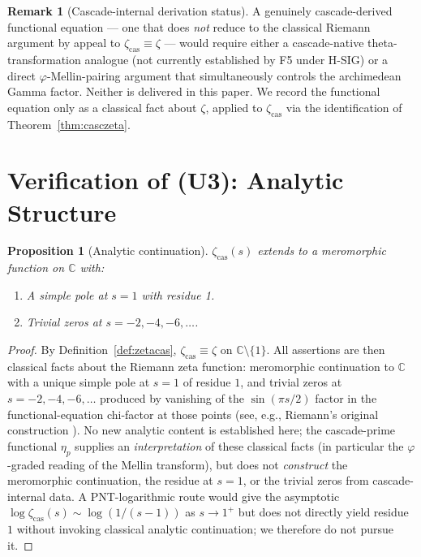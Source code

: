 \documentclass[11pt, a4paper]{amsart}
\newtheorem{proposition}[theorem]{Proposition}
\theoremstyle{definition}
\newtheorem{remark}[theorem]{Remark}
\newcommand{\C}{\mathbb{C}}
\newcommand{\pphi}{\varphi}
\newcommand{\zetacas}{\zeta_{\mathrm{cas}}}
\begin{document}
\begin{remark}[Cascade-internal derivation status]
A genuinely cascade-derived functional equation --- one that does
\emph{not} reduce to the classical Riemann argument by appeal to
$\zetacas \equiv \zeta$ --- would require either a cascade-native
theta-transformation analogue (not currently established by F5
under H-SIG) or a direct $\pphi$-Mellin-pairing argument that
simultaneously controls the archimedean Gamma factor.  Neither is
delivered in this paper.  We record the functional equation only
as a classical fact about $\zeta$, applied to $\zetacas$ via the
identification of Theorem~\ref{thm:casczeta}.
\end{remark}

\section{Verification of (U3): Analytic Structure}\label{sec:analytic}

\begin{proposition}[Analytic continuation]\label{prop:analytic}
$\zetacas(s)$ extends to a meromorphic function on $\C$ with:
\begin{enumerate}
\item[(a)] A simple pole at $s=1$ with residue 1.
\item[(b)] Trivial zeros at $s = -2, -4, -6, \ldots$.
\end{enumerate}
\end{proposition}

\begin{proof}
By Definition~\ref{def:zetacas}, $\zetacas \equiv \zeta$ on
$\C \setminus \{1\}$.  All assertions are then classical facts
about the Riemann zeta function: meromorphic continuation to $\C$
with a unique simple pole at $s = 1$ of residue $1$, and trivial
zeros at $s = -2, -4, -6, \ldots$ produced by vanishing of the
$\sin(\pi s/2)$ factor in the functional-equation chi-factor at
those points (see, e.g., Riemann's original construction
\cite{Riemann1859}).  No new analytic content is
established here; the cascade-prime functional $\eta_p$ supplies an
\emph{interpretation} of these classical facts (in particular the
$\pphi$-graded reading of the Mellin transform), but does not
\emph{construct} the meromorphic continuation, the residue at $s = 1$,
or the trivial zeros from cascade-internal data.  A PNT-logarithmic
route would give the asymptotic
$\log \zetacas(s) \sim \log(1/(s-1))$ as $s \to 1^+$ but does not
directly yield residue $1$ without invoking classical analytic
continuation; we therefore do not pursue it.
\end{proof}
\end{document}
